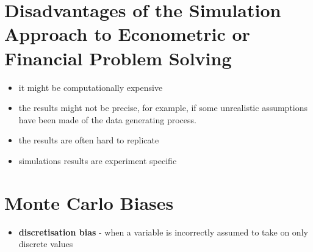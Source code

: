 \section{Disadvantages of the Simulation Approach to Econometric or Financial Problem Solving}
\begin{itemize}
	\item it might be computationally expensive
	\item the results might not be precise, for example, if some unrealistic assumptions have been made of the data generating process.
	\item the results are often hard to replicate
	\item simulations results are experiment specific
\end{itemize}

\section{Monte Carlo Biases}

\begin{itemize}
	\item \textbf{\color{blue}discretisation bias} - when a variable is incorrectly assumed to take on only discrete values
\end{itemize}
